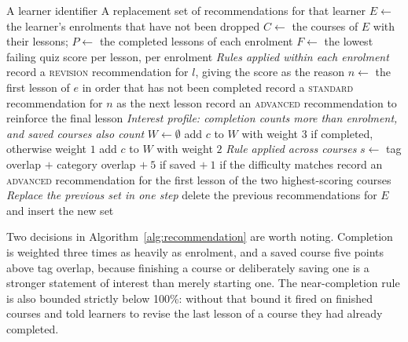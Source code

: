 \documentclass[12pt, oneside]{article} %
\begin{document}
\begin{algorithm}[H]
\caption{Generate recommendations for a learner}
\label{alg:recommendation}
\begin{algorithmic}[1]
\Require A learner identifier
\Ensure A replacement set of recommendations for that learner
\State $E \gets$ the learner's enrolments that have not been dropped
 \State \Return \EndIf
\State $C \gets$ the courses of $E$ with their lessons; $P \gets$ the completed lessons of each enrolment
\State $F \gets$ the lowest failing quiz score per lesson, per enrolment
\Statex \textit{Rules applied within each enrolment}
    \State record a \textsc{revision} recommendation for $l$, giving the score as the reason
  \EndFor
  \State $n \gets$ the first lesson of $e$ in order that has not been completed
    \State record a \textsc{standard} recommendation for $n$ as the next lesson
  \EndIf
    \State record an \textsc{advanced} recommendation to reinforce the final lesson
  \EndIf
\EndFor
\Statex \textit{Interest profile: completion counts more than enrolment, and saved courses also count}
\State $W \gets \emptyset$ 
 \State add $c$ to $W$ with weight $3$ if completed, otherwise weight $1$ \EndFor
{} \State add $c$ to $W$ with weight $2$ \EndFor
\Statex \textit{Rule applied across courses}
  \State $s \gets$ tag overlap $+$ category overlap $+\ 5$ if saved $+\ 1$ if the difficulty matches
\EndFor
\State record an \textsc{advanced} recommendation for the first lesson of the two highest-scoring courses
\Statex \textit{Replace the previous set in one step}
\State delete the previous recommendations for $E$ and insert the new set
\end{algorithmic}
\end{algorithm}

Two decisions in Algorithm~\ref{alg:recommendation} are worth noting. Completion is weighted three times as heavily as enrolment, and a saved course five points above tag overlap, because finishing a course or deliberately saving one is a stronger statement of interest than merely starting one. The near-completion rule is also bounded strictly below 100\%: without that bound it fired on finished courses and told learners to revise the last lesson of a course they had already completed.
\end{document}
